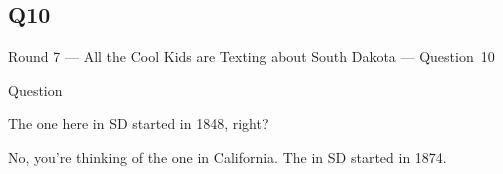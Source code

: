 \documentclass[11pt]{beamer}
\begin{document}
\subsection*{Q10}
\begin{frame}[t]{Round 7 --- All the Cool Kids are Texting about South Dakota --- \mbox{Question 10}}
\begin{block}{Question}

\begin{minipage}{0.9\textwidth}
\begin{mdframed}[
    roundcorner=7pt,
    backgroundcolor=black!5,
    linecolor=black!5,
    fontcolor=black,
    ignorelastdescenders]
\begin{flushleft}
{\small{}\selectfont{}
The one here in SD started in 1848, right?
}
\end{flushleft}
\end{mdframed}
\end{minipage}

\hfill{}\begin{minipage}{0.9\textwidth}
\begin{mdframed}[
    roundcorner=7pt,
    backgroundcolor=blue!80!white,
    linecolor=blue!80!white,
    fontcolor=white,
    ignorelastdescenders]
\begin{flushleft}
{\small{}\selectfont{}
No, you're thinking of the one in California.  The \textunderscore{}\textunderscore{}\textunderscore{}\textunderscore{}\textunderscore{}\textunderscore{} \textunderscore{}\textunderscore{}\textunderscore{}\textunderscore{}\textunderscore{}\textunderscore{} in SD started in 1874.
}
\end{flushleft}
\end{mdframed}
\end{minipage}
\end{block}
\end{frame}
\end{document}
